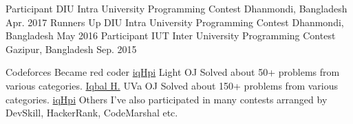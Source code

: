 
\begin{cvhonors}
  \cvhonor
    {Participant}
    {DIU Intra University Programming Contest}
    {Dhanmondi, Bangladesh}
    {Apr. 2017}
  \cvhonor
    {Runners Up}
    {DIU Intra University Programming Contest}
    {Dhanmondi, Bangladesh}
    {May 2016}
  \cvhonor
    {Participant}
    {IUT Inter University Programming Contest}
    {Gazipur, Bangladesh}
    {Sep. 2015}
\end{cvhonors}

\begin{cvhonors}
  \cvhonor
    {Codeforces}
    {Became red coder}
    {}
    {\href{http://gt.com}{iqHpi}}
  \cvhonor
    {Light OJ}
    {Solved about 50+ problems from various categories.}
    {}
    {\href{http://gt.com}{Iqbal H.}}
  \cvhonor
    {UVa OJ}
    {Solved about 150+ problems from various categories.}
    {}
    {\href{http://gt.com}{iqHpi}}
  \cvhonor
    {Others}
    {I've also participated in many contests arranged by DevSkill, HackerRank, CodeMarshal etc.}
    {}
    {}
\end{cvhonors}
